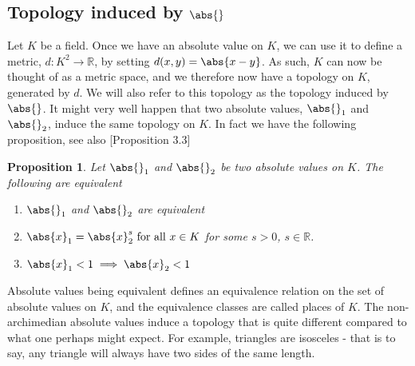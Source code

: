 \documentclass{article}
\newtheorem{proposition}{Proposition}[section]
\newcommand{\mbb}[1]{\mathbb{#1}}
\numberwithin{equation}{section}
\begin{document}


\subsection{Topology induced by $\abs{}$}
Let $K$ be a field. Once we have an absolute value on $K$, we can use it to define a metric, $d : K^2 \to \mbb R$, by setting $d(x,y) = \abs{x - y}$. As such, $K$ can now be thought of as a metric space, and we therefore now have a topology on $K$, generated by $d$. We will also refer to this topology as the topology induced by $\abs{}$. It might very well happen that two absolute values, $\abs{}_1$ and $\abs{}_2$, induce the same topology on $K$. In fact we have the following proposition, see also \citep{neukirch}[Proposition 3.3]
\begin{proposition}\label{Equivalent absolute values}
    Let $\abs{}_1$ and $\abs{}_2$ be two absolute values on $K$. The following are equivalent
    \begin{enumerate}
        \item $\abs{}_1$ and $\abs{}_2$ are equivalent
        \item $\abs{x}_1 = \abs{x}_2^s \text{ for all } x\in K$ for some $s > 0$, $s \in \mbb R$.
        \item $\abs{x}_1 < 1 \implies \abs{x}_2 < 1$
    \end{enumerate}
\end{proposition}



Absolute values being equivalent defines an equivalence relation on the set of absolute values on $K$, and the equivalence classes are called places of $K$. The non-archimedian absolute values induce a topology that is quite different compared to what one perhaps might expect. For example, triangles are isosceles - that is to say, any triangle will always have two sides of the same length.
\end{document}
